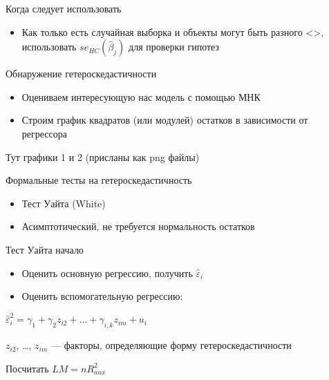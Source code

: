 \documentclass[ignorenonframetext,]{beamer}
\begin{document}
\begin{frame}{Когда следует использовать}

\begin{itemize}
\itemsep1pt\parskip0pt
\item
  Как только есть случайная выборка и объекты могут быть разного
  \textless{}\textgreater{}, использовать \(se_{HC}(\hat{\beta}_j)\) для
  проверки гипотез
\end{itemize}

\end{frame}

\begin{frame}{Обнаружение гетероскедастичности}

\begin{itemize}
\item
  Оцениваем интересующую нас модель с помощью МНК
\item
  Строим график квадратов (или модулей) остатков в зависимости от
  регрессора
\end{itemize}

Тут графики 1 и 2 (присланы как png файлы)

\end{frame}

\begin{frame}{Формальные тесты на гетероскедастичность}

\begin{itemize}
\item
  Тест Уайта (White)
\item
  Асимптотический, не требуется нормальность остатков
\end{itemize}

\end{frame}

\begin{frame}{Тест Уайта начало}

\begin{itemize}
\item
  Оценить основную регрессию, получить \(\hat{\varepsilon}_i\)
\item
  Оценить вспомогательную регрессию:
\end{itemize}

\(\hat{\varepsilon}^2_i = \gamma_1 + \gamma_2 z_{i2} + \ldots + \gamma_{i,k} z_{im}+ u_i\)

\(z_{i2}\), \ldots, \(z_{im}\) --- факторы, определяющие форму
гетероскедастичности

Посчитать \(LM=nR^2_{aux}\)

\end{frame}
\end{document}
